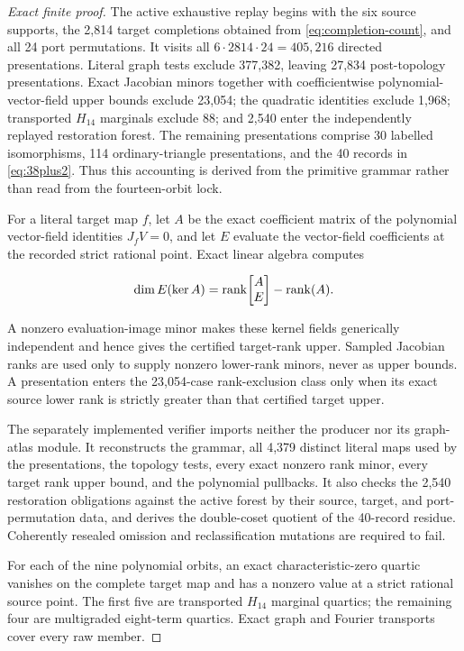 \begin{proof}[Exact finite proof]
The active exhaustive replay begins with the six source supports, the 2,814
target completions obtained from \eqref{eq:completion-count}, and all 24 port
permutations.  It visits all
\(6\cdot2814\cdot24=405{,}216\) directed presentations.  Literal graph
tests exclude 377,382, leaving 27,834 post-topology presentations.  Exact
Jacobian minors together with coefficientwise polynomial-vector-field upper
bounds exclude 23,054; the quadratic identities exclude 1,968; transported
\(H_{14}\) marginals exclude 88; and 2,540 enter the independently replayed
restoration forest.  The remaining presentations comprise 30 labelled
isomorphisms, 114 ordinary-triangle presentations, and the 40 records in
\eqref{eq:38plus2}.  Thus this accounting is derived from the primitive
grammar rather than read from the fourteen-orbit lock.

For a literal target map \(f\), let \(A\) be the exact coefficient matrix of
the polynomial vector-field identities \(J_fV=0\), and let \(E\) evaluate the
vector-field coefficients at the recorded strict rational point.  Exact linear
algebra computes

\[
 \dim E(\ker A)=\operatorname{rank}\!\begin{bmatrix}A\\E\end{bmatrix}-\operatorname{rank}(A).
\]

A nonzero evaluation-image minor makes these kernel fields generically
independent and hence gives the certified target-rank upper.  Sampled Jacobian
ranks are used only to supply nonzero lower-rank minors, never as upper bounds.
A presentation enters the 23,054-case rank-exclusion class only when its exact
source lower rank is strictly greater than that certified target upper.

The separately implemented verifier imports neither the producer nor its
graph-atlas module.  It reconstructs the grammar, all 4,379 distinct literal
maps used by the presentations, the topology tests, every exact nonzero rank
minor, every target rank upper bound, and the polynomial pullbacks.  It also
checks the 2,540 restoration obligations against the active forest by their
source, target, and port-permutation data, and derives the double-coset
quotient of the 40-record residue.  Coherently resealed omission and
reclassification mutations are required to fail.

For each of the nine polynomial orbits, an exact characteristic-zero quartic
vanishes on the complete target map and has a nonzero value at a strict
rational source point.  The first five are transported \(H_{14}\) marginal
quartics; the remaining four are multigraded eight-term quartics.  Exact graph
and Fourier transports cover every raw member.


\end{proof}
